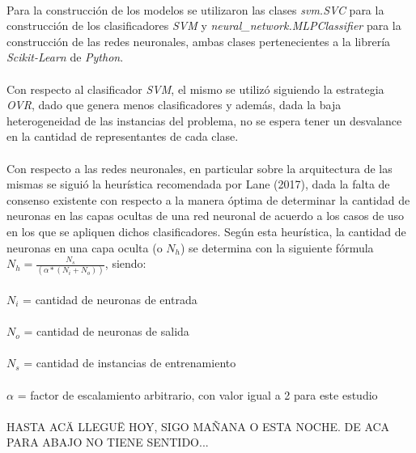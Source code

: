 \paragraph{} Para la construcción de los modelos se utilizaron las clases \textit{svm.SVC} para la construcción de los clasificadores \textit{SVM} y \textit{neural\_network.MLPClassifier} para la construcción de las redes neuronales, ambas clases pertenecientes a la librería \textit{Scikit-Learn} de \textit{Python}.

\paragraph{} Con respecto al clasificador \textit{SVM}, el mismo se utilizó siguiendo la estrategia \textit{OVR}, dado que genera menos clasificadores y además, dada la baja heterogeneidad de las instancias del problema, no se espera tener un desvalance en la cantidad de representantes de cada clase. 

\paragraph{} Con respecto a las redes neuronales, en particular sobre la arquitectura de las mismas se siguió la heurística recomendada por Lane (2017), dada la falta de consenso existente con respecto a la manera óptima de determinar la cantidad de neuronas en las capas ocultas de una red neuronal de acuerdo a los casos de uso en los que se apliquen dichos clasificadores. Según esta heurística, la cantidad de neuronas en una capa oculta (o $N_h$) se determina con la siguiente fórmula $N_h = \frac{N_s} {(\alpha * (N_i + N_o))}$, siendo:
\\
\\
$N_i$ = cantidad de neuronas de entrada
\\
\\
$N_o$ = cantidad de neuronas de salida
\\
\\
$N_s$ = cantidad de instancias de entrenamiento
\\
\\
$\alpha$ = factor de escalamiento arbitrario, con valor igual a 2 para este estudio

\paragraph{} HASTA ACÄ LLEGUË HOY, SIGO MAÑANA O ESTA NOCHE. DE ACA PARA ABAJO NO TIENE SENTIDO...

